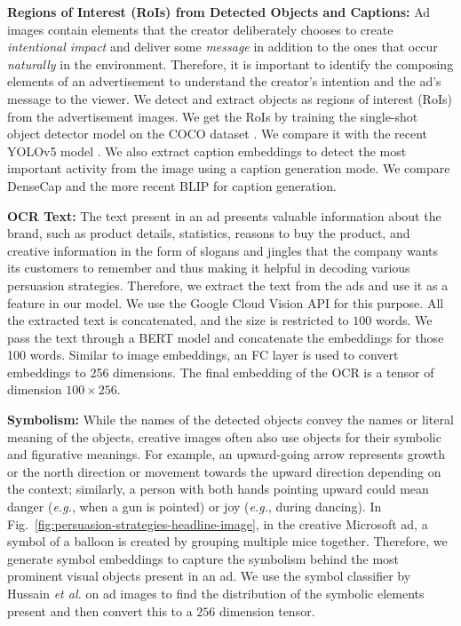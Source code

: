 \textbf{Regions of Interest (RoIs) from Detected Objects and Captions:} %
Ad images contain elements that the creator deliberately chooses to create \textit{intentional impact} and deliver some \textit{message} in addition to the ones that occur \textit{naturally} in the environment. Therefore, it is important to identify the composing elements of an advertisement to understand the creator's intention and the ad's message to the viewer. We detect and extract objects as regions of interest (RoIs) from the advertisement images. We get the RoIs by training the single-shot object detector model \cite{liu2016ssd} on the COCO dataset \cite{lin2014microsoft}. We compare it with the recent YOLOv5 model \cite{redmon2016you}. We also extract caption embeddings to detect the most important activity from the image using a caption generation mode. We compare DenseCap \cite{yang2017dense} and the more recent BLIP \cite{li2022blip} for caption generation.




\textbf{OCR Text:} The text present in an ad presents valuable information about the brand, such as product details, statistics, reasons to buy the product, and creative information in the form of slogans and jingles that the company wants its customers to remember and thus making it helpful in decoding various persuasion strategies. Therefore, we extract the text from the ads and use it as a feature in our model. We use the Google Cloud Vision API for this purpose. All the extracted text is concatenated, and the size is restricted to $100$ words. We pass the text through a BERT model and concatenate the embeddings for those 100 words. Similar to image embeddings, an FC layer is used to convert embeddings to 256 dimensions. The final embedding of the OCR is a tensor of dimension $100 \times 256$. 


\textbf{Symbolism:} While the names of the detected objects convey the names or literal meaning of the objects, creative images often also use objects for their symbolic and figurative meanings. For example, an upward-going arrow represents growth or the north direction or movement towards the upward direction depending on the context; similarly, a person with both hands pointing upward could mean danger (\textit{e.g.}, when a gun is pointed) or joy (\textit{e.g.}, during dancing). In Fig.~\ref{fig:persuasion-strategies-headline-image}, in the creative Microsoft ad, a symbol of a balloon is created by grouping multiple mice together. Therefore, we generate symbol embeddings to capture the symbolism behind the most prominent visual objects present in an ad. We use the symbol classifier by Hussain \textit{et al.} \cite{hussain2017automatic} on ad images to find the distribution of the symbolic elements present and then convert this to a $256$ dimension tensor. %





